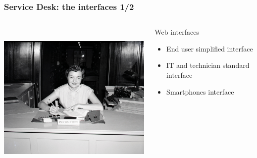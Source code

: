 \documentclass{beamer}
\begin{document}
\begin{frame}

    \frametitle{Service Desk: the interfaces 1/2}

 \begin{columns}
 \begin{column}{0.45\textwidth}
         \includegraphics[height=7.5cm]{./pics/servicedesk2.jpg}
 \end{column}
 \begin{column}{0.45\textwidth}
     \begin{block}{Web interfaces}
        \begin{itemize}
            \item End user simplified interface
            \item IT and technician standard interface
            \item Smartphones interface
        \end{itemize}
    \end{block}
  
 \end{column}
\end{columns}






\end{frame}
\end{document}
